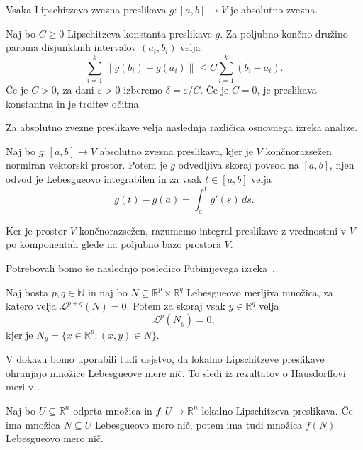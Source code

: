 \documentclass[mat2, tisk]{fmfdelo}
\begin{document}
\begin{trditev}\label{LipschAbs}
Vsaka Lipschitzevo zvezna preslikava
$g \colon [a,b] \to V$ je absolutno zvezna.
\end{trditev}

\begin{dokaz}
Naj bo $C \geq 0$ Lipschitzeva konstanta preslikave
$g$. Za poljubno končno družino paroma disjunktnih
intervalov $(a_i,b_i)$ velja
\[
\sum_{i=1}^{k}\|g(b_i)-g(a_i)\|
\leq C\sum_{i=1}^{k}(b_i-a_i).
\]
Če je $C>0$, za dani $\varepsilon>0$ izberemo
$\delta=\varepsilon/C$. Če je $C=0$, je preslikava
konstantna in je trditev očitna.
\end{dokaz}

Za absolutno zvezne preslikave velja naslednja
različica osnovnega izreka analize.

\begin{izrek}\label{AbsOIA}
Naj bo $g \colon [a,b] \to V$ absolutno zvezna
preslikava, kjer je $V$ končnorazsežen normiran
vektorski prostor. Potem je $g$ odvedljiva skoraj
povsod na $[a,b]$, njen odvod je Lebesgueovo
integrabilen in za vsak $t \in [a,b]$ velja
\[
g(t)-g(a)=\int_a^t g'(s)\,ds.
\]
\end{izrek}

Ker je prostor $V$ končnorazsežen, razumemo
integral preslikave z vrednostmi v $V$ po
komponentah glede na poljubno bazo prostora $V$.

Potrebovali bomo še naslednjo posledico
Fubinijevega izreka~\cite{Evans}.

\begin{izrek}\label{fubini}
Naj bosta $p,q \in \mathbb{N}$ in naj bo $N \subseteq \mathbb{R}^p \times
\mathbb{R}^q$ Lebesgueovo merljiva množica,
za katero velja $\mathcal{L}^{p+q}(N)=0$.
Potem za skoraj vsak $y \in \mathbb{R}^q$ velja
\[
\mathcal{L}^p(N_y)=0,
\]
kjer je
$N_y=\{x\in\mathbb{R}^p:(x,y)\in N\}$.
\end{izrek}

V dokazu bomo uporabili tudi dejstvo, da lokalno
Lipschitzeve preslikave ohranjajo množice
Lebesgueove mere nič. To sledi iz rezultatov
o Hausdorffovi meri v~\cite[izreka~2.5 in~2.8]{Evans}.

\begin{lema}\label{meranic}
Naj bo $U \subseteq \mathbb{R}^n$ odprta množica
in $f \colon U \to \mathbb{R}^n$ lokalno
Lipschitzeva preslikava. Če ima množica
$N \subseteq U$ Lebesgueovo mero nič, potem ima
tudi množica $f(N)$ Lebesgueovo mero nič.
\end{lema}
\end{document}
